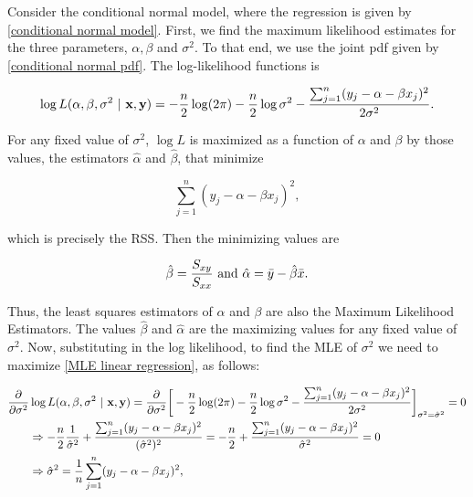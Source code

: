 \documentclass{homework}
\begin{document}
Consider the conditional normal model, where the regression is given by \eqref{conditional normal model}. First, we find the maximum likelihood estimates for the three parameters, $\alpha, \beta$ and $\sigma^2$. To that end, we use the joint pdf given by 
\eqref{conditional normal pdf}. The log-likelihood functions is 

\begin{equation}
\log L(\alpha,\beta, \sigma^2 \textnormal{ } | \textnormal{ } {\bf x},{\bf y}) = -\frac{n}{2}\log(2\pi) - \frac{n}{2}\log \sigma^2 - \frac{\sum_{j=1}^{n}(y_j - \alpha - \beta x_j)^2}{2\sigma^2}.
\label{MLE linear regression}
\end{equation}

For any fixed value of $\sigma^2$, $\log L$ is maximized as a function of $\alpha$ and $\beta$ by those values, the estimators $\hat{\alpha}$ and $\hat{\beta}$, that minimize 

$$
\sum_{j=1}^{n}(y_j - \alpha - \beta x_j)^2,
$$

which is precisely the RSS. Then the minimizing values are 


\begin{align*}
   \hat{\beta} = \frac{S_{xy}}{S_{xx}} \textnormal{ and } \hat{\alpha} = \bar{y} - \hat{\beta}\bar{x}.
\end{align*}

Thus, the least squares estimators of $\alpha$ and $\beta$ are also the Maximum Likelihood Estimators. The values $\hat{\beta}$ and $\hat{\alpha}$ are the maximizing values for any fixed value of $\sigma^2$. Now, substituting in the log likelihood, to find the MLE of $\sigma^2$ we need to maximize \eqref{MLE linear regression}, as follows:

\begin{align*}
    \frac{\partial}{\partial \sigma^2} & \log L(\alpha,\beta, \sigma^2 \textnormal{ } | \textnormal{ } {\bf x},{\bf y}) = \frac{\partial}{\partial \sigma^2} \bigg[-\frac{n}{2}\log(2\pi) - \frac{n}{2}\log \sigma^2 - \frac{\sum_{j=1}^{n}(y_j - \alpha - \beta x_j)^2}{2\sigma^2}\bigg]_{\sigma^2 = \hat{\sigma}^2} = 0 \\
    &\Rightarrow -\frac{n}{2} \frac{1}{\hat{\sigma}^2} + \frac{\sum_{j=1}^{n}(y_j - \alpha - \beta x_j)^2}{(\hat{\sigma}^2)^2} = -\frac{n}{2} + \frac{\sum_{j=1}^{n}(y_j - \alpha - \beta x_j)^2}{\hat{\sigma}^2} = 0 \\
    &\Rightarrow \hat{\sigma}^2 = \frac{1}{n} \sum_{j=1}^{n}(y_j - \alpha - \beta x_j)^2,
\end{align*}
\end{document}
